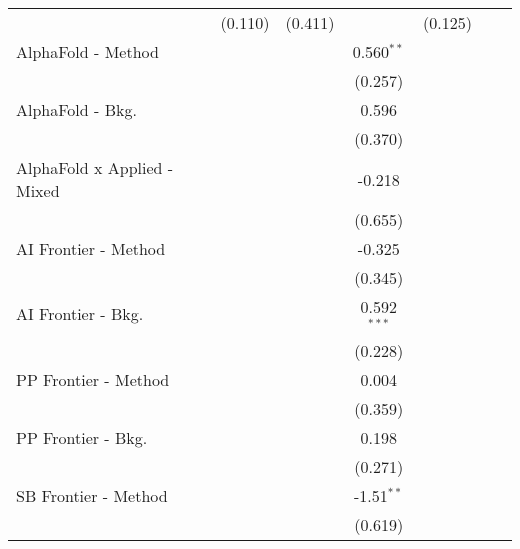 \begin{tabular}{lcccccc}
                                  & (0.110)        & (0.411)       &                & (0.125)       &        &   \\   
   AlphaFold - Method             &                &               & 0.560$^{**}$   &               &        &   \\   
                                  &                &               & (0.257)        &               &        &   \\   
   AlphaFold - Bkg.               &                &               & 0.596          &               &        &   \\   
                                  &                &               & (0.370)        &               &        &   \\   
   AlphaFold x Applied - Mixed    &                &               & -0.218         &               &        &   \\   
                                  &                &               & (0.655)        &               &        &   \\   
   AI Frontier - Method           &                &               & -0.325         &               &        &   \\   
                                  &                &               & (0.345)        &               &        &   \\   
   AI Frontier - Bkg.             &                &               & 0.592$^{***}$  &               &        &   \\   
                                  &                &               & (0.228)        &               &        &   \\   
   PP Frontier - Method           &                &               & 0.004          &               &        &   \\   
                                  &                &               & (0.359)        &               &        &   \\   
   PP Frontier - Bkg.             &                &               & 0.198          &               &        &   \\   
                                  &                &               & (0.271)        &               &        &   \\   
   SB Frontier - Method           &                &               & -1.51$^{**}$   &               &        &   \\   
                                  &                &               & (0.619)        &               &        &   \\   

\end{tabular}
